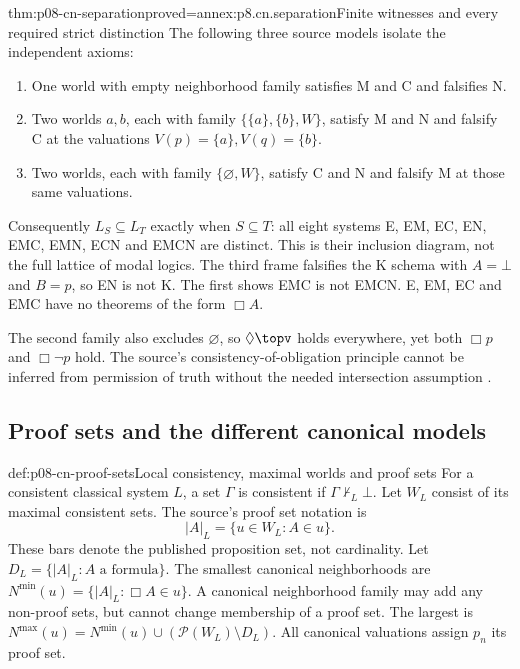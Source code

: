 \begin{hbtheorem}{thm:p08-cn-separation}{proved=annex:p8.cn.separation}{Finite witnesses and every required strict distinction}
The following three source models isolate the independent axioms:
\begin{enumerate}
\item One world with empty neighborhood family satisfies M and C
      and falsifies N.
\item Two worlds \(a,b\), each with family
      \(\{\{a\},\{b\},W\}\), satisfy M and N and falsify C
      at the valuations \(V(p)=\{a\},V(q)=\{b\}\).
\item Two worlds, each with family \(\{\varnothing,W\}\),
      satisfy C and N and falsify M at those same valuations.
\end{enumerate}
Consequently \(L_S\subseteq L_T\) exactly when \(S\subseteq T\):
all eight systems E, EM, EC, EN, EMC, EMN, ECN and EMCN are distinct.
This is their inclusion diagram, not the full lattice of modal logics.
The third frame falsifies the K schema with \(A=\bot\) and
\(B=p\), so EN is not K. The first shows EMC is not EMCN.
E, EM, EC and EMC have no theorems of the form \(\Box A\).

The second family also excludes \(\varnothing\), so
\(\Diamond\topv\) holds everywhere, yet both \(\Box p\)
and \(\Box\neg p\) hold. The source's consistency-of-obligation
principle cannot be inferred from permission of truth without the
needed intersection assumption
\cite[theorems~7.4, 9.2; exercises~7.2, 9.7]{Chellas1980}.
\end{hbtheorem}

\subsection{Proof sets and the different canonical models}
\label{sec:p08-cn-canonical}

\begin{hbdefinition}{def:p08-cn-proof-sets}{Local consistency, maximal worlds and proof sets}
For a consistent classical system \(L\), a set \(\Gamma\)
is consistent if \(\Gamma\nvdash_L\bot\).
Let \(W_L\) consist of its maximal consistent sets.
The source's proof set notation is
\[
                   |A|_L=\{u\in W_L:A\in u\}.
\]
These bars denote the published proposition set, not cardinality.
Let \(D_L=\{|A|_L:A\text{ a formula}\}\).
The smallest canonical neighborhoods are
\(N^{\min}(u)=\{|A|_L:\Box A\in u\}\).
A canonical neighborhood family may add any non-proof sets,
but cannot change membership of a proof set. The largest is
\(N^{\max}(u)=N^{\min}(u)\cup(\mathcal P(W_L)\setminus D_L)\).
All canonical valuations assign \(p_n\) its proof set.
\end{hbdefinition}

